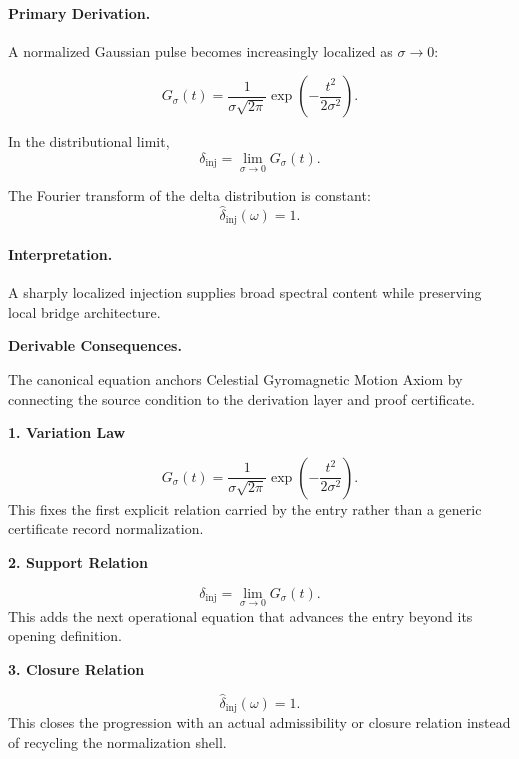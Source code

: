 \paragraph{Primary Derivation.}
A normalized Gaussian pulse becomes increasingly localized as $\sigma\to0$:

\begin{equation}
G_{\sigma}(t)
=
\frac{1}{\sigma\sqrt{2\pi}}
\exp\left(
-\frac{t^2}{2\sigma^2}
\right).
\end{equation}

In the distributional limit,
\begin{equation}
\delta_{\mathrm{inj}}
=
\lim_{\sigma\to0}G_{\sigma}(t).
\end{equation}

The Fourier transform of the delta distribution is constant:
\begin{equation}
\boxed{
\widehat{\delta}_{\mathrm{inj}}(\omega)=1.
}
\end{equation}

\paragraph{Interpretation.}
A sharply localized injection supplies broad spectral content while preserving local bridge architecture.

\par\vspace{0.35em}
\noindent\textbf{Derivable Consequences.}\quad
\begingroup
\footnotesize
\raggedright
The canonical equation anchors Celestial Gyromagnetic Motion Axiom by connecting the source condition to the derivation layer and proof certificate.
\par\endgroup

\noindent\textbf{1. Variation Law}\par
\[
G_{\sigma}(t) = \frac{1}{\sigma\sqrt{2\pi}} \exp\left( -\frac{t^2}{2\sigma^2} \right).
\]
\noindent This fixes the first explicit relation carried by the entry rather than a generic certificate record normalization.\par
\noindent\textbf{2. Support Relation}\par
\[
\delta_{\mathrm{inj}} = \lim_{\sigma\to0}G_{\sigma}(t).
\]
\noindent This adds the next operational equation that advances the entry beyond its opening definition.\par
\noindent\textbf{3. Closure Relation}\par
\[
\widehat{\delta}_{\mathrm{inj}}(\omega)=1.
\]
\noindent This closes the progression with an actual admissibility or closure relation instead of recycling the normalization shell.\par

